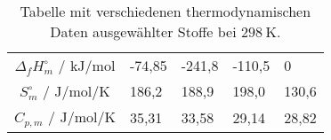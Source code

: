 \documentclass[./main.tex]{subfiles}
\begin{document}
\begin{table}[H]
    \caption{Tabelle mit verschiedenen thermodynamischen Daten ausgew\"ahlter Stoffe bei $\SI{298}{\kelvin}$.}
    \label{tab: 2025-10-3_therm. Daten2}
    \centering
    \begin{tabular}{cC{1.5cm}C{1.5cm}C{1.5cm}C{1.5cm}}
    \toprule
        &  &  &  & \\\midrule
        $\Delta_fH^{\circ}_m$ / $\si{\kilo\joule\per\mole}$ & -74,85 & -241,8 & -110,5 & 0\\
        $S^{\circ}_m$ / $\si{\joule\per\mole\per\kelvin}$ & 186,2 & 188,9 & 198,0 & 130,6\\
        $C_{p, m}$ / $\si{\joule\per\mole\per\kelvin}$ & 35,31 & 33,58 & 29,14 & 28,82\\\bottomrule
    \end{tabular}
\end{table}

\aufgabenende
\end{document}
